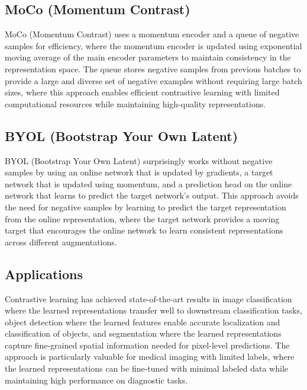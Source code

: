 \subsection{MoCo (Momentum Contrast)}

MoCo (Momentum Contrast) uses a momentum encoder and a queue of negative samples for efficiency, where the momentum encoder is updated using exponential moving average of the main encoder parameters to maintain consistency in the representation space. The queue stores negative samples from previous batches to provide a large and diverse set of negative examples without requiring large batch sizes, where this approach enables efficient contrastive learning with limited computational resources while maintaining high-quality representations.

\subsection{BYOL (Bootstrap Your Own Latent)}

BYOL (Bootstrap Your Own Latent) surprisingly works without negative samples by using an online network that is updated by gradients, a target network that is updated using momentum, and a prediction head on the online network that learns to predict the target network's output. This approach avoids the need for negative samples by learning to predict the target representation from the online representation, where the target network provides a moving target that encourages the online network to learn consistent representations across different augmentations.

\subsection{Applications}

Contrastive learning has achieved state-of-the-art results in image classification where the learned representations transfer well to downstream classification tasks, object detection where the learned features enable accurate localization and classification of objects, and segmentation where the learned representations capture fine-grained spatial information needed for pixel-level predictions. The approach is particularly valuable for medical imaging with limited labels, where the learned representations can be fine-tuned with minimal labeled data while maintaining high performance on diagnostic tasks.



